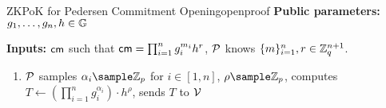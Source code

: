 {%















































\newpage

\begin{protocol}{ZKPoK for Pedersen Commitment Opening}{openproof}
    \vspace{1em}
    \textbf{Public parameters:}  $g_1, \dots, g_n, h \in \mathbb{G}$

    \textbf{Inputs:} $\mathsf{cm}$ such that $\mathsf{cm} = \prod_{i=1}^ng_i^{m_i}h^r$, \;    $\mathcal{P}$ knows $\{m\}_{i=1}^n, r \in \mathbb{Z}_q^{n+1}$.

    \vspace{1em}

    \begin{enumerate}
        \item $\mathcal{P}$ samples $\alpha_i \sample \Z_p$ for $i \in [1,n]$, $\rho \sample \Z_p$, computes $T \gets (\prod_{i=1}^ng_i^{\alpha_i})\cdot h^{\rho}$, sends $T$ to $\mathcal{V}$
        

\end{enumerate}
\end{protocol}}
